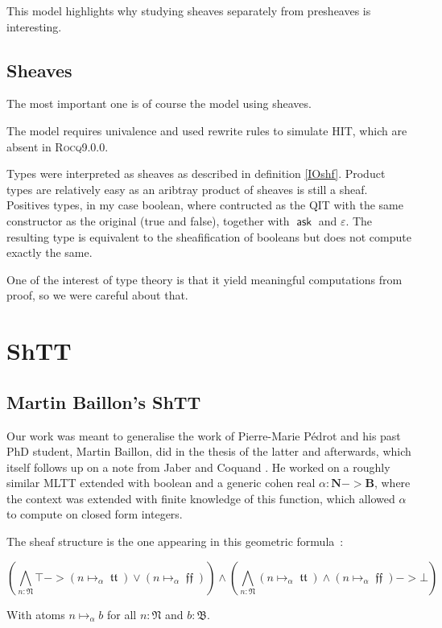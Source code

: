 \documentclass[11pt]{article}
\DeclareMathOperator{\ask}{\mathsf{ask}}
\DeclareMathOperator{\mtrue}{\mathfrak{tt}}
\DeclareMathOperator{\mfalse}{\mathfrak{ff}}
\newcommand{\0}{\mathbf{0}}
\newcommand{\1}{\mathbf{1}}
\newcommand{\nat}{\mathbf{N}}
\newcommand{\mnat}{\mathfrak{N}}
\newcommand{\bool}{\mathbf{B}}
\newcommand{\mbool}{\mathfrak{B}}
\newcommand{\rocq}{\textsc{Rocq}}
\begin{document}
This model highlights why studying sheaves separately from presheaves is interesting.

\subsection{Sheaves}

The most important one is of course the model using sheaves.

The model requires univalence and used rewrite rules to simulate HIT, which are absent in \rocq 9.0.0.

Types were interpreted as sheaves as described in definition \ref{IOshf}. Product types are relatively easy as an aribtray product of sheaves is still a sheaf. Positives types, in my case boolean, where contructed as the QIT with the same constructor as the original (true and false), together with $\ask$ and $\varepsilon$. The resulting type is equivalent to the sheafification of booleans but does not compute exactly the same.

One of the interest of type theory is that it yield meaningful computations from proof, so we were careful about that.

\section{ShTT}\label{ShTT}
\subsection{Martin Baillon's ShTT}\label{MBshtt}
Our work was meant to generalise the work of Pierre-Marie Pédrot and his past PhD student, Martin Baillon, did in the thesis of the latter \cite{baillon:tel-04617881} and afterwards, which itself follows up on a note from Jaber and Coquand \cite{10.5555/1839560.1839564}. He worked on a roughly similar MLTT extended with boolean and a generic cohen real $\alpha: \nat -> \bool$, where the context was extended with finite knowledge of this function, which allowed $\alpha$ to compute on closed form integers.

The sheaf structure is the one appearing in this geometric formula~:

$$ \left(\bigwedge_{n : \mnat} \top -> (n \mapsto_\alpha \mtrue) \vee (n \mapsto_\alpha \mfalse)\right) \wedge \left(\bigwedge_{n : \mnat} (n\mapsto_\alpha \mtrue) \wedge (n \mapsto_\alpha \mfalse) -> \bot \right)$$

With atoms $n \mapsto_\alpha b$ for all $n : \mnat$ and $b:\mbool$.
\end{document}
